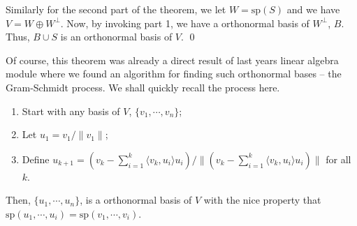 \documentclass[
]{article}
\theoremstyle{definition}
\theoremstyle{definition}
\begin{document}
Similarly for the second part of the theorem, we let
\(W = \text{sp}(S)\) and we have \(V = W \oplus W^\bot\). Now, by
invoking part 1, we have a orthonormal basis of \(W^\bot\), \(B\). Thus,
\(B \cup S\) is an orthonormal basis of \(V\). \qed

Of course, this theorem was already a direct result of last years linear
algebra module where we found an algorithm for finding such orthonormal
bases -- the Gram-Schmidt process. We shall quickly recall the process
here.

\begin{enumerate}
  \item Start with any basis of \(V\), \(\{v_1, \cdots, v_n\}\);
  \item Let \(u_1 = v_1 / \|v_1\|\);
  \item Define \(u_{k + 1} = (v_k - \sum_{i = 1}^k \langle v_k, u_i \rangle u_i) / 
    \| (v_k - \sum_{i = 1}^k \langle v_k, u_i \rangle u_i) \|\) for all \(k\).
\end{enumerate}

Then, \(\{u_1, \cdots, u_n\}\), is a orthonormal basis of \(V\) with the
nice property that
\(\text{sp}(u_1, \cdots, u_i) = \text{sp}(v_1, \cdots, v_i)\).
\end{document}
